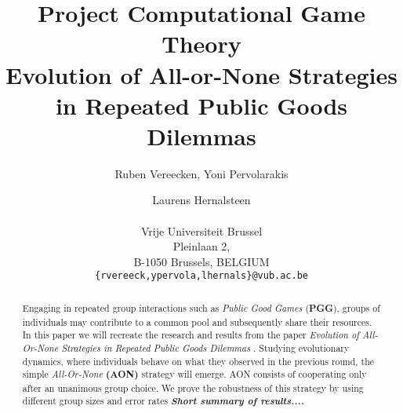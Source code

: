 \documentclass[letterpaper]{article}
\title{Project Computational Game Theory\\Evolution of All-or-None Strategies in Repeated Public Goods Dilemmas}
\author{Ruben Vereecken, Yoni Pervolarakis \and Laurens Hernalsteen \\
\mbox{}\\Vrije Universiteit Brussel \\Pleinlaan 2, \\B-1050 Brussels, BELGIUM\\
{\texttt{\{rvereeck,ypervola,lhernals\}@vub.ac.be}}}
\begin{document}
\maketitle

\begin{abstract}
Engaging in repeated group interactions such as \textit{Public Good Games}  (\textbf{PGG}), groups of individuals may contribute to a common pool and subsequently share their resources. In this paper we will recreate the research and results from the paper  \textit{Evolution of All-Or-None Strategies in Repeated Public Goods Dilemmas}  \citep{project}. Studying evolutionary dynamics, where individuals behave on what they observed in the previous round, the simple \textit{All-Or-None} \textbf{(AON)} strategy  will emerge. AON consists of cooperating only after an unanimous group choice. We prove the robustness of this strategy by using different group sizes and error rates
\textit{\textbf{Short summary of results....}}


\end{abstract}
\end{document}
